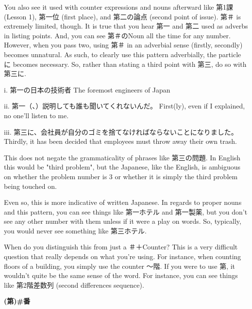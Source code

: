 \par{ You also see it used with counter expressions and nouns afterward like 第1課 (Lesson 1), 第一位 (first place), and 第二の論点 (second point of issue). 第＃ is extremely limited, though. It is true that you hear 第一 and 第二 used as adverbs in listing points. And, you can see 第＃のNoun all the time for any number. However, when you pass two, using 第＃ in an adverbial sense (firstly, secondly) becomes unnatural. As such, to clearly use this pattern adverbially, the particle に becomes necessary. So, rather than stating a third point with 第三, do so with 第三に. }

\par{i. 第一の日本の技術者 \hfill\break
The foremost engineers of Japan }

\par{ii. 第一（、）説明しても誰も聞いてくれないんだ。 \hfill\break
First(ly), even if I explained, no one'll listen to me. }

\par{iii. 第三に、会社員が自分のゴミを捨てなければならないことになりました。 \hfill\break
Thirdly, it has been decided that employees must throw away their own trash. }

\par{ This does not negate the grammaticality of phrases like 第三の問題. In English this would be "third problem", but the Japanese, like the English, is ambiguous on whether the problem number is 3 or whether it is simply the third problem being touched on. }

\par{ Even so, this is more indicative of written Japanese. In regards to proper nouns and this pattern, you can see things like 第一ホテル and 第一製薬, but you don't see any other number with them unless if it were a play on words. So, typically, you would never see something like 第三ホテル. }

\par{ When do you distinguish this from just a ＃＋Counter? This is a very difficult question that really depends on what you're using. For instance, when counting floors of a building, you simply use the counter ～階. If you were to use 第, it wouldn't quite be the same sense of the word. For instance, you can see things like 第2階差数列 (second differences sequence). }

\begin{center}
\textbf{(第)\#番 } 
\end{center}

